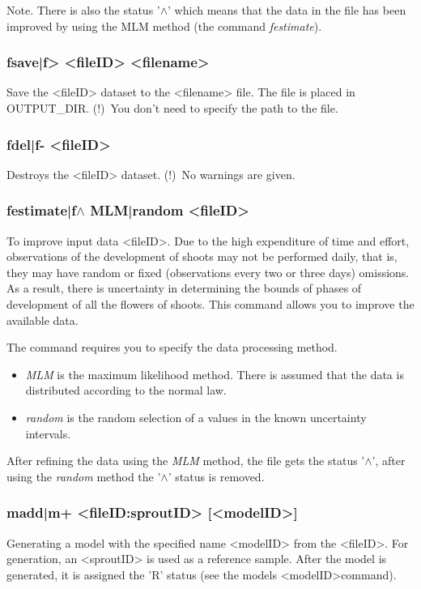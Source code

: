 \documentclass[a4paper]{article}
\begin{document}
Note. There is also the status '$\wedge$' which means that the data in the file has been improved by using the MLM method (the command \textit{festimate}).

\subsubsection{fsave|f> <fileID> <filename>}
Save the <fileID> dataset to the <filename> file. The file is placed in OUTPUT\_DIR. (!)~You don't need to specify the path to the file.

\subsubsection{fdel|f- <fileID>}
Destroys the <fileID> dataset. (!)~No warnings are given.

\subsubsection{festimate|f$\wedge$ MLM|random <fileID>}
To improve input data <fileID>. Due to the high expenditure of time and effort, observations of the development of shoots may not be performed daily, that is, they may have random or fixed (observations every two or three days) omissions. As a result, there is uncertainty in determining the bounds of phases of development of all the flowers of shoots. This command allows you to improve the available data. 

The command requires you to specify the data processing method. 
\begin{itemize}
\item \textit{MLM} is the maximum likelihood method. There is assumed that the data is distributed according to the normal law.
\item \textit{random} is the random selection of a values in the known uncertainty intervals.
\end{itemize}
After refining the data using the \textit{MLM} method, the file gets the status '$\wedge$', after using the \textit{random} method the '$\wedge$' status is removed.

\subsubsection{madd|m+ <fileID:sproutID> [<modelID>]}
Generating a model with the specified name <modelID> from the <fileID>. For generation, an <sproutID> is used as a reference sample. After the model is generated, it is assigned the 'R' status (see the models <modelID>command).
\end{document}
